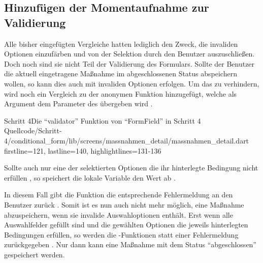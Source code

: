\subsection{Hinzufügen der Momentaufnahme zur Validierung}

Alle bisher eingefügten Vergleiche hatten lediglich den Zweck,
die invaliden Optionen einzufärben und von der Selektion durch den Benutzer auszuschließen.
Doch noch sind sie nicht Teil der Validierung des Formulars.
Sollte der Benutzer die aktuell eingetragene Maßnahme im abgeschlossenen Status abspeichern wollen,
so kann dies auch mit invaliden Optionen erfolgen.
Um das zu verhindern,
wird noch ein Vergleich zu der anonymen Funktion hinzugefügt,
welche als Argument dem Parameter  des  übergeben wird \Lst{\ref{lst:Schritt4validator}}.

\begin{alexlisting}{Schritt 4}{Die \enquote{validator} Funktion von \enquote{FormField} in Schritt 4}
  {Quellcode/Schritt-4/conditional_form/lib/screens/massnahmen_detail/massnahmen_detail.dart}
  {firstline=121, lastline=140, highlightlines={131-136}}
  \label{lst:Schritt4validator}
\end{alexlisting}

Sollte auch nur eine der selektierten Optionen  die ihr hinterlegte Bedingung nicht erfüllen ,
so speichert die lokale Variable  den Wert  ab .

In diesem Fall gibt die Funktion die entsprechende Fehlermeldung an den Benutzer zurück .
Somit ist es nun auch nicht mehr möglich,
eine Maßnahme abzuspeichern,
wenn sie invalide Auswahloptionen enthält.
Erst wenn alle Auswahlfelder gefüllt sind
und die gewählten Optionen die jeweils hinterlegten Bedingungen erfüllen,
so werden die -Funktionen  statt einer Fehlermeldung zurückgegeben .
Nur dann kann eine Maßnahme mit dem Status \enquote{abgeschlossen} gespeichert werden.



